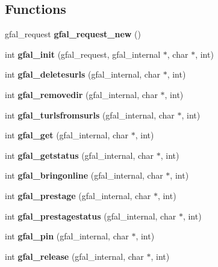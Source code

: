 \subsection*{Functions}
\begin{CompactItemize}
\item 
gfal\_\-request \textbf{gfal\_\-request\_\-new} ()\label{gfal__common_8h_b5d503849656335232e56583b376ee22}

\item 
int \textbf{gfal\_\-init} (gfal\_\-request, gfal\_\-internal $\ast$, char $\ast$, int)\label{gfal__common_8h_0716a4d199225519746d4dd88621dd57}

\item 
int \textbf{gfal\_\-deletesurls} (gfal\_\-internal, char $\ast$, int)\label{gfal__common_8h_8ec8e45c58067eb06cd8836d85668ce5}

\item 
int \textbf{gfal\_\-removedir} (gfal\_\-internal, char $\ast$, int)\label{gfal__common_8h_40eba4bdcf3d5d99631bdd8bfa9029e0}

\item 
int \textbf{gfal\_\-turlsfromsurls} (gfal\_\-internal, char $\ast$, int)\label{gfal__common_8h_54ec3268b58bf5630c2c024e2786cb5c}

\item 
int \textbf{gfal\_\-get} (gfal\_\-internal, char $\ast$, int)\label{gfal__common_8h_f53cbbdfbf7fa2eb4a112adac9cca181}

\item 
int \textbf{gfal\_\-getstatus} (gfal\_\-internal, char $\ast$, int)\label{gfal__common_8h_04aeeae94e9415bbbbc66c05e9d1d5f0}

\item 
int \textbf{gfal\_\-bringonline} (gfal\_\-internal, char $\ast$, int)\label{gfal__common_8h_6e5d230e9c6c10f7eb0812c3e715da8b}

\item 
int \textbf{gfal\_\-prestage} (gfal\_\-internal, char $\ast$, int)\label{gfal__common_8h_6e812150f464fa1ad38f4fbd822eeac4}

\item 
int \textbf{gfal\_\-prestagestatus} (gfal\_\-internal, char $\ast$, int)\label{gfal__common_8h_873df094d8cbd7df805daef71f1397d7}

\item 
int \textbf{gfal\_\-pin} (gfal\_\-internal, char $\ast$, int)\label{gfal__common_8h_e3d50efa31f015cba9f0bb9f76dbd760}

\item 
int \textbf{gfal\_\-release} (gfal\_\-internal, char $\ast$, int)\label{gfal__common_8h_e1fbb1b6c81d1e9b227ac3bdafcab05b}


\end{CompactItemize}
